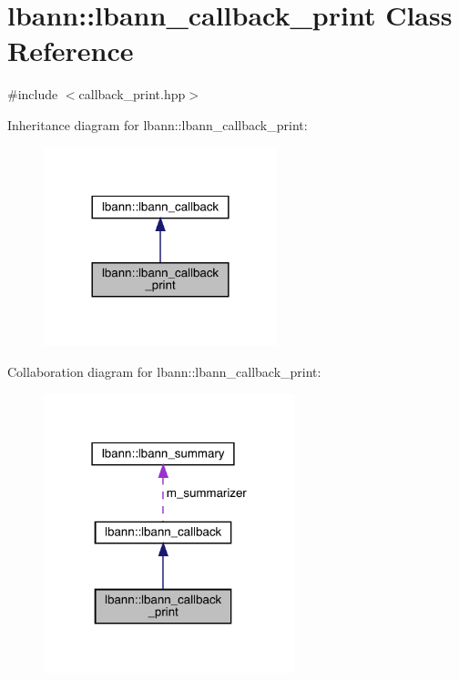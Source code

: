 \hypertarget{classlbann_1_1lbann__callback__print}{}\section{lbann\+:\+:lbann\+\_\+callback\+\_\+print Class Reference}
\label{classlbann_1_1lbann__callback__print}


{\ttfamily \#include $<$callback\+\_\+print.\+hpp$>$}



Inheritance diagram for lbann\+:\+:lbann\+\_\+callback\+\_\+print\+:\nopagebreak
\begin{figure}[H]
\begin{center}
\leavevmode
\includegraphics[width=192pt]{classlbann_1_1lbann__callback__print__inherit__graph}
\end{center}
\end{figure}


Collaboration diagram for lbann\+:\+:lbann\+\_\+callback\+\_\+print\+:\nopagebreak
\begin{figure}[H]
\begin{center}
\leavevmode
\includegraphics[width=207pt]{classlbann_1_1lbann__callback__print__coll__graph}
\end{center}
\end{figure}
